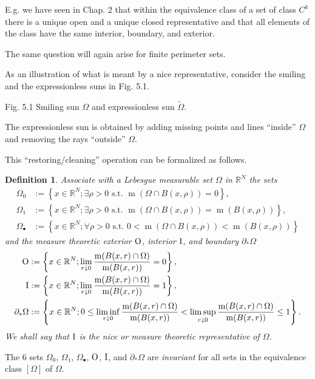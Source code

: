 \documentclass{book}
\numberwithin{equation}{section}
\newtheorem{definition}{Definition}[section]
\begin{document}
\begin{enumerate}
    E.g. we have seen in Chap. 2 that within the equivalence class of a set of class $C^k$ there is a unique open and a unique closed representative and that all elements of the class have the same interior, boundary, and exterior.
    
    The same question will again arise for finite perimeter sets.
    
    As an illustration of what is meant by a nice representative, consider the smiling and the expressionless suns in Fig. 5.1.
    
    \textsf{Fig. 5.1 Smiling sun $\Omega$ and expressionless sun $\tilde{\Omega}$.}
    
    The expressionless sun is obtained by adding missing points and lines ``inside'' $\Omega$ and removing the rays ``outside'' $\Omega$.
    
    This ``restoring/cleaning'' operation can be formalized as follows.
    
    \begin{definition}
        Associate with a Lebesgue measurable set $\Omega$ in $\mathbb{R}^N$ the sets
        \begin{align*}
            \Omega_0 &:= \left\{x\in\mathbb{R}^N;\exists\rho > 0 \mbox{ s.t. } \operatorname{m}(\Omega\cap B(x,\rho)) = 0\right\},\\
            \Omega_1 &:= \left\{x\in\mathbb{R}^N;\exists\rho > 0 \mbox{ s.t. } \operatorname{m}(\Omega\cap B(x,\rho)) = \operatorname{m}(B(x,\rho))\right\},\\
            \Omega_\bullet &:= \left\{x\in\mathbb{R}^N;\forall\rho > 0 \mbox{ s.t. } 0 < \operatorname{m}(\Omega\cap B(x,\rho)) < \operatorname{m}(B(x,\rho))\right\}
        \end{align*}
        and the \emph{measure theoretic exterior} ${\rm O}$, \emph{interior} ${\rm I}$, and \emph{boundary} $\partial_*\Omega$
        \begin{align*}
            {\rm O} &:= \left\{x\in\mathbb{R}^N;\lim_{r\downarrow 0} \frac{\operatorname{m}(B(x,r)\cap\Omega)}{\operatorname{m}(B(x,r))} = 0\right\},\\
            {\rm I} &:= \left\{x\in\mathbb{R}^N;\lim_{r\downarrow 0} \frac{\operatorname{m}(B(x,r)\cap\Omega)}{\operatorname{m}(B(x,r))} = 1\right\},\\
            \partial_*\Omega &:= \left\{x\in\mathbb{R}^N;0\le\liminf_{r\downarrow 0} \frac{\operatorname{m}(B(x,r)\cap\Omega)}{\operatorname{m}(B(x,r))} < \limsup_{r\downarrow 0} \frac{\operatorname{m}(B(x,r)\cap\Omega)}{\operatorname{m}(B(x,r))} \le 1\right\}.
        \end{align*}
        We shall say that ${\rm I}$ is the \emph{nice} or \emph{measure theoretic representative} of $\Omega$.
    \end{definition}
    The 6 sets $\Omega_0$, $\Omega_1$, $\Omega_\bullet$, ${\rm O}$, ${\rm I}$, and $\partial_*\Omega$ are \textit{invariant} for all sets in the equivalence class $[\Omega]$ of $\Omega$.
    

\end{enumerate}
\end{document}
